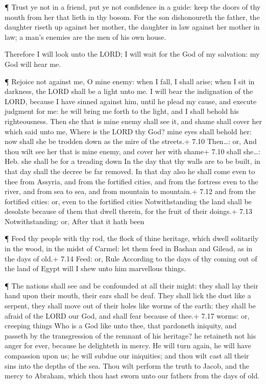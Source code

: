  ¶ Trust ye not in a friend, put ye not confidence in a
guide: keep the doors of thy mouth from her that lieth in thy bosom.
 For the son dishonoureth the father, the daughter riseth up
against her mother, the daughter in law against her mother in law; a
man's enemies are the men of his own house.

 Therefore I will look unto the LORD; I will wait for the
God of my salvation: my God will hear me.

 ¶ Rejoice not against me, O mine enemy: when I fall, I
shall arise; when I sit in darkness, the LORD shall be a light unto me.
 I will bear the indignation of the LORD, because I have
sinned against him, until he plead my cause, and execute judgment for
me: he will bring me forth to the light, and I shall behold his
righteousness.  Then she that is mine enemy shall see it,
and shame shall cover her which said unto me, Where is the LORD thy God?
mine eyes shall behold her: now shall she be trodden down as the mire of
the streets.+ 7.10 Then\ldots: or, And thou wilt see her that is mine
enemy, and cover her with shame+ 7.10 shall she\ldots: Heb. she shall be
for a treading down  In the day that thy walls are to be
built, in that day shall the decree be far removed.  In
that day also he shall come even to thee from Assyria, and from the
fortified cities, and from the fortress even to the river, and from sea
to sea, and from mountain to mountain.+ 7.12 and from the fortified
cities: or, even to the fortified cities  Notwithstanding
the land shall be desolate because of them that dwell therein, for the
fruit of their doings.+ 7.13 Notwithstanding: or, After that it hath
been

 ¶ Feed thy people with thy rod, the flock of thine
heritage, which dwell solitarily in the wood, in the midst of Carmel:
let them feed in Bashan and Gilead, as in the days of old.+ 7.14 Feed:
or, Rule  According to the days of thy coming out of the
land of Egypt will I shew unto him marvellous things.

 ¶ The nations shall see and be confounded at all their
might: they shall lay their hand upon their mouth, their ears shall be
deaf.  They shall lick the dust like a serpent, they shall
move out of their holes like worms of the earth: they shall be afraid of
the LORD our God, and shall fear because of thee.+ 7.17 worms: or,
creeping things  Who is a God like unto thee, that
pardoneth iniquity, and passeth by the transgression of the remnant of
his heritage? he retaineth not his anger for ever, because he delighteth
in mercy.  He will turn again, he will have compassion upon
us; he will subdue our iniquities; and thou wilt cast all their sins
into the depths of the sea.  Thou wilt perform the truth to
Jacob, and the mercy to Abraham, which thou hast sworn unto our fathers
from the days of old.
